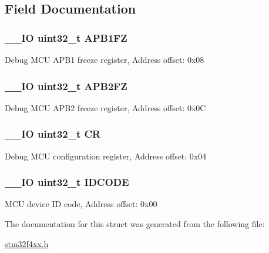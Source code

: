 \subsection{Field Documentation}
\hypertarget{struct_d_b_g_m_c_u___type_def_a5eaefc557573ae7bdc632ef6b6d574b5}{
\subsubsection[{A\-P\-B1\-F\-Z}]{\setlength{\rightskip}{0pt plus 5cm}\-\_\-\-\_\-\-I\-O uint32\-\_\-t A\-P\-B1\-F\-Z}}\label{struct_d_b_g_m_c_u___type_def_a5eaefc557573ae7bdc632ef6b6d574b5}
Debug M\-C\-U A\-P\-B1 freeze register, Address offset\-: 0x08 \hypertarget{struct_d_b_g_m_c_u___type_def_a4628a8c32f97ef93b15b2b503ef90c75}{
\subsubsection[{A\-P\-B2\-F\-Z}]{\setlength{\rightskip}{0pt plus 5cm}\-\_\-\-\_\-\-I\-O uint32\-\_\-t A\-P\-B2\-F\-Z}}\label{struct_d_b_g_m_c_u___type_def_a4628a8c32f97ef93b15b2b503ef90c75}
Debug M\-C\-U A\-P\-B2 freeze register, Address offset\-: 0x0\-C \hypertarget{struct_d_b_g_m_c_u___type_def_ab40c89c59391aaa9d9a8ec011dd0907a}{
\subsubsection[{C\-R}]{\setlength{\rightskip}{0pt plus 5cm}\-\_\-\-\_\-\-I\-O uint32\-\_\-t C\-R}}\label{struct_d_b_g_m_c_u___type_def_ab40c89c59391aaa9d9a8ec011dd0907a}
Debug M\-C\-U configuration register, Address offset\-: 0x04 \hypertarget{struct_d_b_g_m_c_u___type_def_a24df28d0e440321b21f6f07b3bb93dea}{
\subsubsection[{I\-D\-C\-O\-D\-E}]{\setlength{\rightskip}{0pt plus 5cm}\-\_\-\-\_\-\-I\-O uint32\-\_\-t I\-D\-C\-O\-D\-E}}\label{struct_d_b_g_m_c_u___type_def_a24df28d0e440321b21f6f07b3bb93dea}
M\-C\-U device I\-D code, Address offset\-: 0x00 

The documentation for this struct was generated from the following file\-:\begin{DoxyCompactItemize}
\item 
\hyperlink{stm32f4xx_8h}{stm32f4xx.\-h}\end{DoxyCompactItemize}
